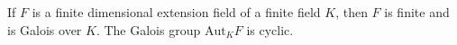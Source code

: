 If $F$ is a finite dimensional extension field of a finite field $K$, then $F$ is finite and is Galois over $K$. The Galois group $\mathrm{Aut}_K F$ is cyclic.
